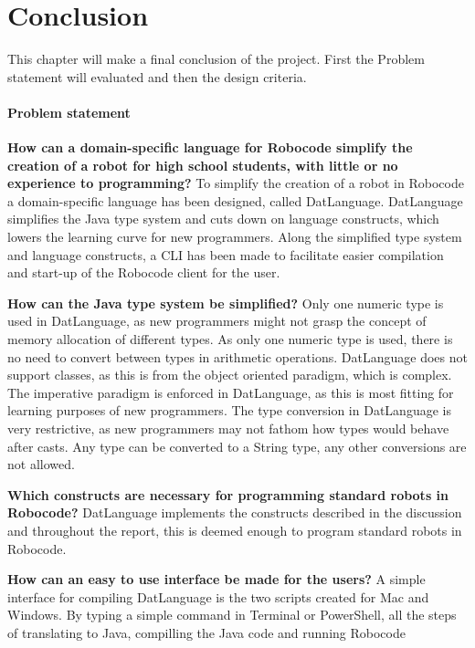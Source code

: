 \chapter{Conclusion}
\label{chap:Conclusion}
This chapter will make a final conclusion of the project. First the Problem statement will evaluated and then the design criteria.

\subsubsection{Problem statement}
\textbf{How can a domain-specific language for Robocode simplify the creation of a robot for high school students, with little or no experience to programming?} \newline
To simplify the creation of a robot in Robocode a domain-specific language has been designed, called DatLanguage. DatLanguage simplifies the Java type system and cuts down on language constructs, which lowers the learning curve for new programmers. Along the simplified type system and language constructs, a CLI has been made to facilitate easier compilation and start-up of the Robocode client for the user.

\textbf{How can the Java type system be simplified?} \newline
Only one numeric type is used in DatLanguage, as new programmers might not grasp the concept of memory allocation of different types. As only one numeric type is used, there is no need to convert between types in arithmetic operations. DatLanguage does not support classes, as this is from the object oriented paradigm, which is complex. The imperative paradigm is enforced in DatLanguage, as this is most fitting for learning purposes of new programmers. The type conversion in DatLanguage is very restrictive, as new programmers may not fathom how types would behave after casts. Any type can be converted to a String type, any other conversions are not allowed. 

\textbf{Which constructs are necessary for programming standard robots in Robocode?} \newline
DatLanguage implements the constructs described in the discussion and throughout the report, this is deemed enough to program standard robots in Robocode. 

\textbf{How can an easy to use interface be made for the users?} \newline
A simple interface for compiling DatLanguage is the two scripts created for Mac and Windows. By typing a simple command in Terminal or PowerShell, all the steps of translating to Java, compilling the Java code and running Robocode


